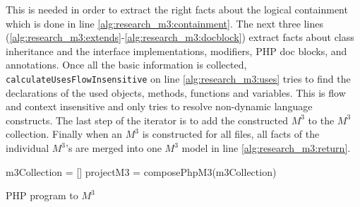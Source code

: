 \documentclass[../main.tex]{subfiles}
\begin{document}
    This is needed in order to extract the right facts about the logical containment which is done in line \ref{alg:research_m3:containment}.
    The next three lines (\ref{alg:research_m3:extends}-\ref{alg:research_m3:docblock}) extract facts about class inheritance and the interface implementations, modifiers, PHP doc blocks, and annotations.
   	Once all the basic information is collected, \texttt{calculateUsesFlowInsensitive} on line \ref{alg:research_m3:uses} tries to find the declarations of the used objects, methods, functions and variables.
   	This is flow and context insensitive and only tries to resolve non-dynamic language constructs.
   	The last step of the iterator is to add the constructed $M^3$ to the $M^3$ collection.
   	Finally when an $M^3$ is constructed for all files, all facts of the individual $M^3$'s are merged into one $M^3$ model in line \ref{alg:research_m3:return}. 
   	\vspace{5 mm}
    \begin{algorithm}[H]
     \BlankLine
	 m3Collection = []\;                                  \label{alg:research_m3:init_collection}
     \BlankLine
	                                                     \label{alg:research_m3:loop_end}
	 \BlankLine
	 \Return projectM3 = composePhpM3(m3Collection)\;     \label{alg:research_m3:return}
	 \caption{PHP program to $M^3$}
	 \label{alg:research_m3}
	\end{algorithm}
    
\end{document}
